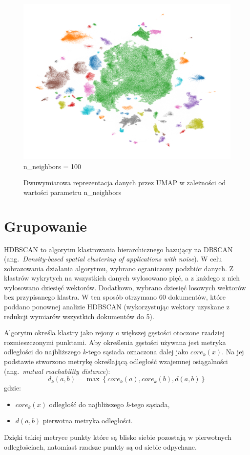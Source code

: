 \begin{figure}[htb]
\begin{minipage}{.33\textwidth}
			\includegraphics[width=\linewidth]{rys04/umap_100_100_100.png}
			n\_neighbors = 100
		\end{minipage}
		\caption{Dwuwymiarowa reprezentacja danych przez UMAP w zależności od wartości parametru n\_neighbors}\label{fig:umap}
	\end{figure}
	

\section{Grupowanie}\label{sec:hdbscan}
	HDBSCAN to algorytm klastrowania hierarchicznego bazujący na DBSCAN (ang.\ \emph{Density-based spatial clustering of applications with noise}).
	W celu zobrazowania działania algorytmu, wybrano ograniczony podzbiór danych.
	Z klastrów wykrytych na wszystkich danych wylosowano pięć, a z każdego z nich wylosowano dziesięć wektorów.
	Dodatkowo, wybrano dziesięć losowych wektorów bez przypisanego klastra.
	W ten sposób otrzymano 60 dokumentów, które poddano ponownej analizie HDBSCAN
		(wykorzystując wektory uzyskane z redukcji wymiarów wszystkich dokumentów do 5).
	
	Algorytm określa klastry jako rejony o większej gęstości otoczone rzadziej rozmieszczonymi punktami.
	Aby określenia gęstości używana jest metryka odległości do najbliższego \emph{k}-tego sąsiada oznaczona dalej jako \(core_k(x)\).
	Na jej podstawie stworzono metrykę określającą odległość wzajemnej osiągalności (ang.\ \emph{mutual reachability distance}):
	\[ d_k(a,b) = \max \left\lbrace core_k(a),core_k(b),d(a,b) \right\rbrace \]
	gdzie:
	\begin{itemize}
		\item \(core_k(x)\) odległość do najbliższego \emph{k}-tego sąsiada,
		\item \(d(a,b)\) pierwotna metryka odległości.
	\end{itemize}
	Dzięki takiej metryce punkty które są blisko siebie pozostają w pierwotnych odległościach, natomiast rzadsze punkty są od siebie odpychane.

